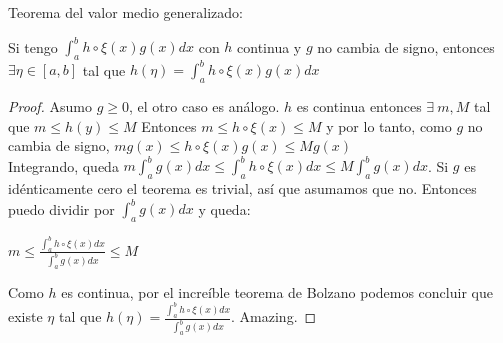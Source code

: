\documentclass[10pt,a4paper,final]{report}
\begin{document}
\begin{theorem}
	Teorema del valor medio generalizado:
	
	Si tengo $\int_a^b h\circ\xi(x) g(x) dx$ con $h$ continua y $g$ no cambia de signo, entonces $\exists \eta \in [a,b]$ tal que 
	$h(\eta)=\int_a^b h\circ\xi(x) g(x) dx$
\end{theorem}

\begin{proof}
	Asumo $g\geq 0$, el otro caso es análogo.
	$h$ es continua entonces $\exists\ m,M$ tal que $m\leq h(y)\leq M$ Entonces $m\leq h\circ \xi(x) \leq M$ y por lo tanto, como $g$ no cambia de signo, $m g(x)\leq h\circ \xi(x) g(x)\leq M g(x)$\\
	
	Integrando, queda $m \int_a^b g(x) dx \leq \int_a^b h\circ \xi(x) dx \leq M \int_a^b g(x) dx$. Si $g$ es idénticamente cero el teorema es trivial, así que asumamos que no. Entonces puedo dividir por $\int_a^b g(x) dx$ y queda:
	
	$m \leq \frac{\int_a^b h\circ \xi(x) dx}{\int_a^b g(x) dx} \leq M$
	
	Como $h$ es continua, por el increíble teorema de Bolzano podemos concluir que existe $\eta$ tal que $h(\eta)=\frac{\int_a^b h\circ \xi(x) dx}{\int_a^b g(x) dx}$. Amazing.
\end{proof}
\end{document}
